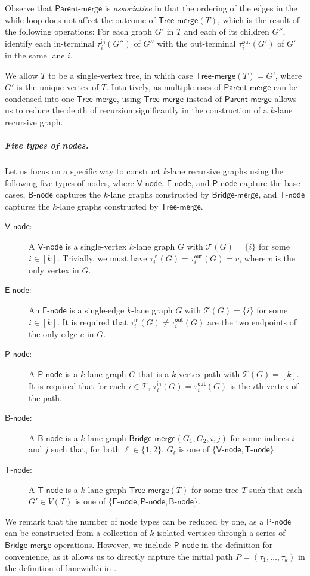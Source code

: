 \documentclass[11pt]{article}
\theoremstyle{definition}
\theoremstyle{remark}
\newcommand{\tin}{\tau^{\mathsf{in}}}
\newcommand{\tout}{\tau^{\mathsf{out}}}
\newcommand{\tmerge}{\mathsf{Tree}\text{-}\mathsf{merge}}
\newcommand{\pmerge}{\mathsf{Parent}\text{-}\mathsf{merge}}
\newcommand{\bmerge}{\mathsf{Bridge}\text{-}\mathsf{merge}}
\newcommand{\vnode}{\mathsf{V}\text{-}\mathsf{node}}
\newcommand{\enode}{\mathsf{E}\text{-}\mathsf{node}}
\newcommand{\bnode}{\mathsf{B}\text{-}\mathsf{node}}
\newcommand{\pnode}{\mathsf{P}\text{-}\mathsf{node}}
\newcommand{\tnode}{\mathsf{T}\text{-}\mathsf{node}}
\begin{document}
Observe that $\pmerge$ is \emph{associative} in that the ordering of the edges in the while-loop does not affect the outcome of $\tmerge(T)$, which is the result of the following operations: For each graph $G'$ in $T$ and each of its children $G''$, identify each in-terminal $\tin_i(G'')$ of $G''$ with the out-terminal $\tout_i(G')$ of $G'$ in the same lane $i$. 



We allow $T$ to be a single-vertex tree, in which case $\tmerge(T) = G'$, where $G'$ is the unique vertex of $T$. Intuitively, as multiple uses of $\pmerge$ can be condensed into one $\tmerge$, using $\tmerge$ instead of $\pmerge$ allows us to reduce the depth of recursion significantly in the construction of a $k$-lane recursive graph.


\subparagraph{Five types of nodes.}
Let us focus on a specific way to construct $k$-lane recursive graphs using the following five types of nodes, where $\vnode$, $\enode$, and $\pnode$ capture the base cases, $\bnode$ captures the $k$-lane graphs constructed by $\bmerge$, and $\tnode$ captures the $k$-lane graphs constructed by $\tmerge$.

\begin{description}
    \item[{$\vnode$}:] A $\vnode$ is a single-vertex $k$-lane graph $G$ with $\mathcal{T}(G)=\{i\}$ for some $i \in [k]$. Trivially, we must have $\tin_i(G)=\tout_i(G)=v$, where $v$ is the only vertex in $G$.
    \item[{$\enode$}:] An $\enode$ is a single-edge $k$-lane graph $G$ with $\mathcal{T}(G)=\{i\}$ for some $i \in [k]$. It is required that  $\tin_i(G) \neq \tout_i(G)$ are the two endpoints of the only edge $e$ in $G$.
    \item[{$\pnode$}:]  A $\pnode$ is a $k$-lane graph $G$ that is a $k$-vertex path with $\mathcal{T}(G)= [k]$. It is required that for each $i \in \mathcal{T}$, $\tin_i(G) = \tout_i(G)$ is the $i$th vertex of the path.
    \item[{$\bnode$}:] A $\bnode$ is a $k$-lane graph $\bmerge(G_1,G_2,i,j)$ for some indices $i$ and $j$ such that, for both $\ell\in\{1,2\}$, $G_\ell$ is one of $\{\vnode,\tnode\}$.
    \item[{$\tnode$}:] A $\tnode$ is a $k$-lane graph $\tmerge(T)$ for some tree $T$ such that each $G' \in V(T)$ is one of $\{\enode, \pnode, \bnode\}$. 
\end{description}

We remark that the number of node types can be reduced by one, as a $\pnode$ can be constructed from a collection of $k$ isolated vertices through a series of $\bmerge$ operations. However, we include $\pnode$ in the definition for convenience, as it allows us to directly capture the initial path $P = (\tau_1, \ldots, \tau_k)$ in the definition of lanewidth in .
\end{document}
